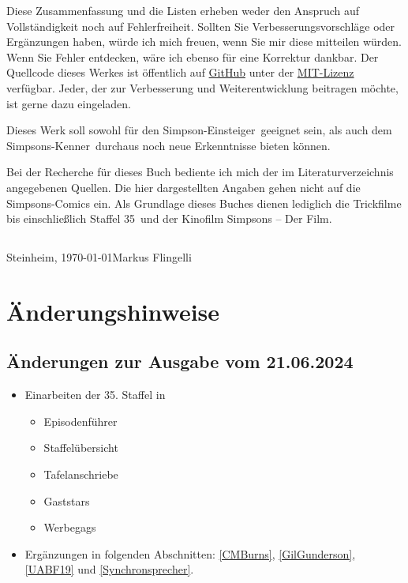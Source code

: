\documentclass[pagesize,twoside,german]{scrbook}
\newcommand{\staffelAnzahl}{35}
\begin{document}
Diese Zusammenfassung und die Listen erheben weder den Anspruch auf Voll\-stän\-dig\-keit noch auf Fehlerfreiheit. Sollten Sie Verbesserungsvorschläge oder Er\-gänz\-un\-gen haben, würde ich mich freuen, wenn Sie mir diese mitteilen würden. Wenn Sie Fehler entdecken, wäre ich ebenso für eine Korrektur dankbar. Der Quellcode dieses Werkes ist öffentlich auf \href{https://github.com/mflingelli/simpsons}{GitHub} unter der \href{https://github.com/mflingelli/simpsons/blob/development/LICENSE.md}{MIT-Lizenz} verfügbar. Jeder, der zur Verbesserung und Weiterentwicklung beitragen möchte, ist gerne dazu eingeladen.

Dieses Werk soll sowohl für den \glqq Simpson-Einsteiger\grqq\ geeignet sein, als auch dem \glqq Simpsons-Kenner\grqq\ durchaus noch neue Erkenntnisse bieten können.

Bei der Recherche für dieses Buch bediente ich mich der im Literaturverzeichnis angegebenen Quellen. Die hier dargestellten Angaben gehen nicht auf die Simpsons-Comics ein. Als Grundlage dieses Buches dienen lediglich die Trickfilme bis einschließlich Staffel \staffelAnzahl\ und der Kinofilm \glqq Simpsons -- Der Film\grqq .

\subsection*{}
{
Steinheim, \today \hfill Markus Flingelli
}


\section*{Änderungshinweise}

\subsection*{Änderungen zur Ausgabe vom 21.06.2024}
\begin{itemize}
	\item Einarbeiten der 35. Staffel in
	\begin{itemize}
		\item Episodenführer
		\item Staffelübersicht
		\item Tafelanschriebe
		\item Gaststars
		\item Werbegags
	\end{itemize}
	\item Ergänzungen in folgenden Abschnitten: \ref{CMBurns}, \ref{GilGunderson}, \ref{UABF19} und \ref{Synchronsprecher}.
\end{itemize}
\end{document}
